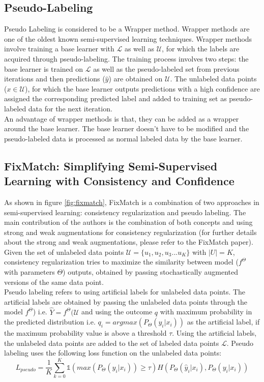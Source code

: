 \subsection{Pseudo-Labeling}
Pseudo Labeling is considered to be a Wrapper method. Wrapper methods are one of the oldest known semi-supervised learning techniques\cite{van2020}. Wrapper methods involve training a base learner with $\mathcal{L}$ as well as $\mathcal{U}$, for which the labels are acquired through pseudo-labeling\cite{mclachlan1975}. The training process involves two steps: the base learner is trained on $\mathcal{L}$ as well as the pseudo-labeled set from previous iterations and then predictions ($\hat{y}$) are obtained on $\mathcal{U}$. The unlabeled data points ($x \in \mathcal{U}$), for which the base learner outputs predictions with a high confidence are assigned the corresponding predicted label and added to training set as pseudo-labeled data for the next iteration. \\
An advantage of wrapper methods is that, they can be added as a wrapper around the base learner. The base learner doesn't have to be modified and the pseudo-labeled data is processed as normal labeled data by the base learner.

\subsection{FixMatch: Simplifying Semi-Supervised Learning with Consistency and Confidence}
As shown in figure \ref{fig:fixmatch}, FixMatch\cite{sohn2020} is a combination of two approaches in semi-supervised learning: consistency regularization\cite{sajjadi2016} and pseudo labeling\cite{mclachlan1975}. The main contribution of the authors is the combination of both concepts and using strong and weak augmentations for consistency regularization (for further details about the strong and weak augmentations, please refer to the FixMatch paper). \\
Given the set of unlabeled data points $\mathcal{U} = \{u_1, u_2, u_3 ... u_K\}$ with $|U| = K$, consistency regularization tries to maximize the similarity between model ($f^\Theta$ with parameters $\Theta$) outputs, obtained by passing stochastically augmented versions of the same data point. \\
Pseudo labeling refers to using artificial labels for unlabeled data points. The artificial labels are obtained by passing the unlabeled data points through the model $f^\Theta$) i.e. $\hat{Y} = f^\Theta(\mathcal{U}$ and using the outcome $q$ with maximum probability in the predicted distribution i.e. $q_i = argmax(P_{\Theta}(y_i | x_i))$ as the artificial label, if the maximum probability value is above a threshold $\tau$. Using the artificial labels, the unlabeled data points are added to the set of labeled data points $\mathcal{L}$. Pseudo labeling uses the following loss function on the unlabeled data points:
\begin{equation}
    \label{equation:fixmatch_pseudo_labeling_loss}
    L_{pseudo} = \frac{1}{K} \sum_{k=0}^{K} \mathbb{1}(max(P_{\Theta}(y_i | x_i)) \geq \tau) H(P_{\Theta}(\hat{y}_i | x_i), P_{\Theta}(y_i | x_i))
\end{equation}

